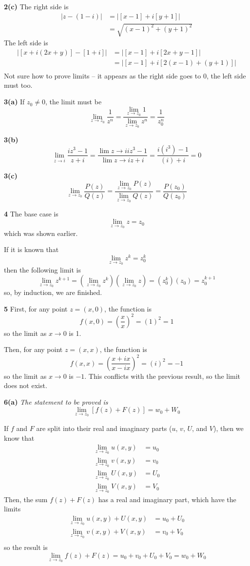 \documentclass{article}
\begin{document}
\textbf{2(c)}
The right side is
\begin{align*}
	|z - (1 - i)| &= |[x - 1] + i[y + 1]| \\
	&= \sqrt{(x - 1)^2 + (y + 1)^2}
\end{align*}
The left side is
\begin{align*}
	| [x + i(2x + y)] - [1 + i] | &= | [x - 1] + i[2x + y - 1] | \\ 
	&= | [x - 1] + i[2(x - 1) + (y + 1)] | \\
\end{align*}
Not sure how to prove limits -- it appears as the right side goes to 0, the left side must too.

\textbf{3(a)}
If $z_0 \neq 0$, the limit must be
\[
	\lim_{z \to z_0} \frac{1}{z^n}
	= \frac{\lim_{z \to z_0} 1}{\lim_{z \to z_0} z^n}
	= \frac{1}{z_0^n}
\]

\textbf{3(b)}
\[
	\lim_{z \to i} \frac{iz^3 - 1}{z + i}
	= \frac{\lim{z \to i} iz^3 - 1}{\lim{z \to i} z + i} 
	= \frac{i(i^3) - 1}{(i) + i}
	= 0
\]

\textbf{3(c)}
\[
	\lim_{z \to z_0} \frac{P(z)}{Q(z)}
	= \frac{\lim_{z \to z_0} P(z)}{\lim_{z \to z_0} Q(z)}
	= \frac{P(z_0)}{Q(z_0)}
\]

\textbf{4}
The base case is
\[
	\lim_{z \to z_0} z = z_0
\]
which was shown earlier. 

If it is known that
\[
	\lim_{z \to z_0} z^k = z_0^k
\]
then the following limit is
\[
	\lim_{z \to z_0} z^{k+1} 
	= \left(\lim_{z \to z_0} z^k \right) \left(\lim_{z \to z_0} z \right)
	= (z_0^k)(z_0) 
	= z_0^{k+1}
\]
so, by induction, we are finished.

\textbf{5}
First, for any point $z = (x, 0)$, the function is
\[
	f(x, 0) = \left( \frac{x}{x} \right)^2 = (1)^2 = 1
\]
so the limit as $x \to 0$ is 1.

Then, for any point $z = (x, x)$, the function is
\[
	f(x, x) = \left( \frac{x + ix}{x - ix} \right)^2 = (i)^2 = -1
\]
so the limit as $x \to 0$ is $-1$. This conflicts with the previous result, so the limit does not exist.

\textbf{6(a)}
\textit{The statement to be proved is
\[
	\lim_{z \to z_0}[f(z) + F(z)] = w_0 + W_0
\]}

If $f$ and $F$ are split into their real and imaginary parts ($u$, $v$, $U$, and $V$), then we know that
\begin{align*}
	\lim_{z \to z_0} u(x, y) &= u_0 \\
	\lim_{z \to z_0} v(x, y) &= v_0 \\
	\lim_{z \to z_0} U(x, y) &= U_0 \\
	\lim_{z \to z_0} V(x, y) &= V_0
\end{align*}
Then, the sum $f(z) + F(z)$ has a real and imaginary part, which have the limits
\begin{align*}
	\lim_{z \to z_0} u(x, y) + U(x, y) &= u_0 + U_0 \\
	\lim_{z \to z_0} v(x, y) + V(x, y) &= v_0 + V_0 \\
\end{align*} 
so the result is
\[
	\lim_{z \to z_0} f(z) + F(z) = u_0 + v_0 + U_0 + V_0 = w_0 + W_0
\]
\end{document}
